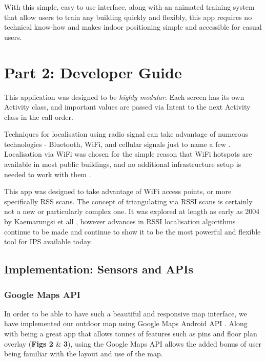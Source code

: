\documentclass[10.8pt]{article}
\begin{document}
With this simple, easy to use interface, along with an animated training system that allow users to train any building quickly and flexibly, this app requires no technical know-how and makes indoor positioning simple and accessible for casual users.


\section*{Part 2: Developer Guide}

This application was designed to be \textit{highly modular}. Each screen has its own Activity class, and important values are passed via Intent to the next Activity class in the call-order. 

Techniques for localisation using radio signal can take advantage of numerous technologies - Bluetooth, WiFi, and cellular signals just to name a few \cite{shchekotov2014indoor}. Localisation via WiFi was chosen for the simple reason that WiFi hotspots are available in most public buildings, and no additional infrastructure setup is needed to work with them \cite{kashevnik2012comparative}.

This app was designed to take advantage of WiFi access points, or more specifically RSS scans. The concept of triangulating via RSSI scans is certainly not a new or particularly complex one. It was explored at length as early as 2004 by Kaemarungsi et all  \cite{kaemarungsi2004modeling}, however advances in RSSI localisation algorithms continue to be made \cite{alsehly2010improving,oguejiofor2013outdoor} and continue to show it to be the most powerful and flexible tool for IPS available today.


\subsection*{Implementation: Sensors and APIs }


\subsubsection*{Google Maps API}

In order to be able to have such a beautiful and responsive map interface, we have implemented our outdoor map using Google Maps Android API \cite{google_maps_api}. Along with being a great app that allows tonnes of features such as pins and floor plan overlay (\textbf{Figs 2} \& \textbf{3}), using the Google Maps API   allows the added bonus of user being familiar with the layout and use of the map.
\end{document}
